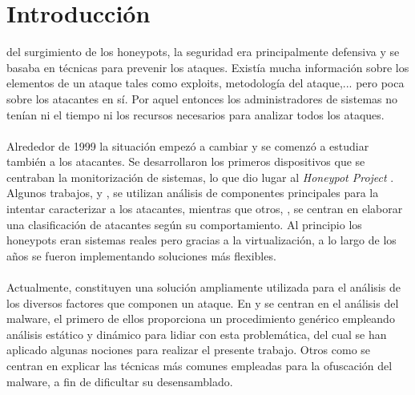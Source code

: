 \documentclass[journal]{IEEEtran}
\begin{document}
%
\IEEEpeerreviewmaketitle



\section{Introducción}
 del surgimiento de los honeypots, la seguridad era principalmente defensiva y se basaba en técnicas para prevenir los ataques. Existía mucha información sobre los elementos de un ataque tales como exploits, metodología del ataque,... pero poca sobre los atacantes en sí. Por aquel entonces los administradores de sistemas no tenían ni el tiempo ni los recursos necesarios para analizar todos los ataques.
\\\\
Alrededor de 1999 la situación empezó a cambiar y se comenzó a estudiar también a los atacantes. Se desarrollaron los primeros dispositivos que se centraban la monitorización de sistemas, lo que dio lugar al {\it Honeypot Project} \cite{honeynet.project}. Algunos trabajos, \cite{caracterizacion_atacantes} y \cite{caracterizacion_atacantes_2}, se utilizan análisis de componentes principales para la intentar caracterizar a los atacantes, mientras que otros, \cite{escala_atacantes}, se centran en elaborar una clasificación de atacantes según su comportamiento. Al principio los honeypots eran sistemas reales pero gracias a la virtualización, a lo largo de los años se fueron implementando soluciones más flexibles.
\\\\
Actualmente, constituyen una solución ampliamente utilizada para el análisis de los diversos factores que componen un ataque. En \cite{practical_malware_analysis} y \cite{compiled_executables} se centran en el análisis del malware, el primero de ellos proporciona un procedimiento genérico empleando análisis estático y dinámico para lidiar con esta problemática, del cual se han aplicado algunas nociones para realizar el presente trabajo. Otros como \cite{ofuscation} se centran en explicar las técnicas más comunes empleadas para la ofuscación del malware, a fin de dificultar su desensamblado.
\end{document}
